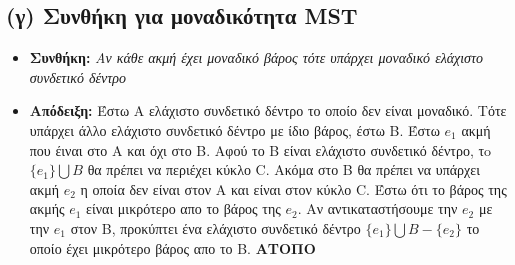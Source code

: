 \documentclass[a4paper,12pt]{report}
\begin{document}
\subsection*{(γ) Συνθήκη για μοναδικότητα MST}
\begin{itemize}
 \item \textbf{Συνθήκη:} \textit{Αν κάθε ακμή έχει μοναδικό βάρος τότε υπάρχει μοναδικό ελάχιστο συνδετικό δέντρο}
 \item \textbf{Απόδειξη:} Έστω Α ελάχιστο συνδετικό δέντρο το οποίο δεν είναι μοναδικό. Τότε υπάρχει άλλο ελάχιστο συνδετικό δέντρο με ίδιο βάρος, έστω B. Έστω $e_1$ ακμή που έιναι στο A και όχι στο B. Αφού το B είναι ελάχιστο συνδετικό δέντρο, τo $\{e_1\}\bigcup B$ θα πρέπει να περιέχει κύκλο C. Ακόμα στο Β θα πρέπει να υπάρχει ακμή $e_2$ η οποία δεν είναι στον A και είναι στον κύκλο C. Έστω ότι το βάρος της ακμής $e_1$ είναι μικρότερο απο το βάρος της $e_2$. Αν αντικαταστήσουμε την $e_2$ με την $e_1$ στον Β, προκύπτει ένα ελάχιστο συνδετικό δέντρο $\{e_1\} \bigcup B - \{e_2\} $ το οποίο έχει μικρότερο βάρος απο το B. \textbf{ΑΤΟΠΟ}  
\end{itemize}
\end{document}
